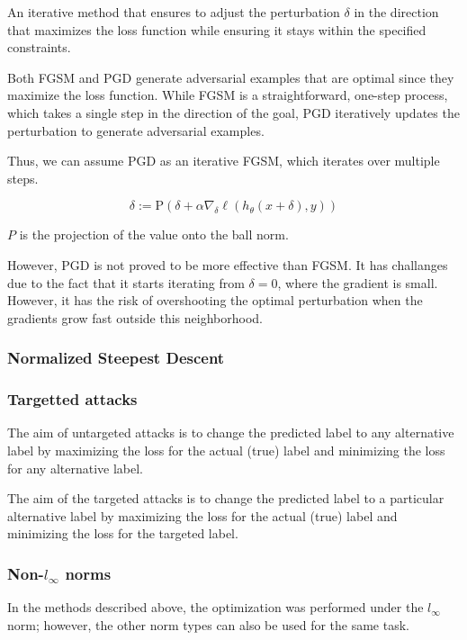 An iterative method that ensures to adjust the perturbation $\delta$ in the direction that maximizes the loss function 
while ensuring it stays within the specified constraints.

Both FGSM and PGD generate adversarial examples that are optimal since they maximize the loss function.
While FGSM is a straightforward, one-step process, which takes a single step in the direction of the goal,
PGD iteratively updates the perturbation to generate adversarial examples. 

Thus, we can assume PGD as an iterative FGSM, which iterates over multiple steps.

\[\delta := \text{P}(\delta + \alpha \nabla_{\delta} \ell(h_\theta(x + \delta), y))\]

$P$ is the projection of the value onto the ball norm.

However, PGD is not proved to be more effective than FGSM. It has challanges due to the fact that it starts iterating 
from $\delta = 0$, where the gradient is small. However, it has the risk of overshooting the optimal 
perturbation when the gradients grow fast outside this neighborhood. 


\subsubsection{Normalized Steepest Descent}

\subsubsection{Targetted attacks}

The aim of untargeted attacks is to change the predicted label to any alternative label 
by maximizing the loss for the actual (true) label and minimizing the loss for any alternative label. 

The aim of the targeted attacks is to change the predicted label to a particular alternative label 
by maximizing the loss for the actual (true) label and minimizing the loss for the targeted label. 


\subsubsection{Non-$l_{\infty}$ norms}


In the methods described above, the optimization was performed under the $l_{\infty}$ norm; however, 
the other norm types can also be used for the same task.

